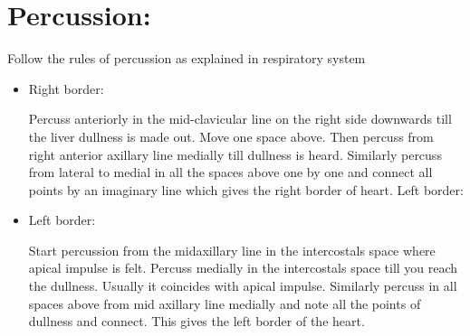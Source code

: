 \documentclass[a4paper,12pt,openany,twoside]{book}
\begin{document}
\section*{Percussion:}
\par
Follow the rules of percussion as explained in respiratory system 
\begin{itemize}
\item{Right border:
	\par
Percuss anteriorly in the mid-clavicular line on the right side downwards till the liver dullness is made out. Move one space above. Then percuss from right anterior axillary line medially till dullness is heard. Similarly percuss from lateral to medial in all the spaces above one by one and connect all points by an imaginary line which gives the right border of heart. Left border:
}
\item{Left border:
	\par
Start percussion from the midaxillary line in the intercostals space where apical impulse is felt. Percuss medially in the intercostals space till you reach the dullness. Usually it coincides with apical impulse. Similarly percuss in all spaces above from mid axillary line medially and note all the points of dullness and connect. This gives the left border of the heart.
}
\end{itemize}
\end{document}
